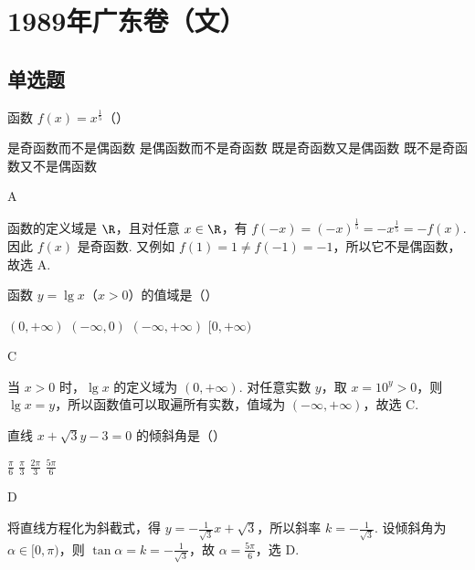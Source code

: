 \chapter{1989年广东卷（文）}

\section{单选题}

\begin{problem}
函数 \(f(x)=x^{\frac{1}{5}}\)（\quad）

\choices
    {是奇函数而不是偶函数}
    {是偶函数而不是奇函数}
    {既是奇函数又是偶函数}
    {既不是奇函数又不是偶函数}
\end{problem}

\begin{answer}
A
\end{answer}

\begin{solution}
函数的定义域是 \(\R\)，且对任意 \(x\in\R\)，有 \(f(-x)=(-x)^{\frac15}=-x^{\frac15}=-f(x)\). 因此 \(f(x)\) 是奇函数. 又例如 \(f(1)=1\neq f(-1)=-1\)，所以它不是偶函数，故选 A.
\end{solution}

\begin{problem}
函数 \(y=\lg x\)（\(x>0\)）的值域是（\quad）

\choices
    {\((0,+\infty)\)}
    {\((-\infty,0)\)}
    {\((-\infty,+\infty)\)}
    {\([0,+\infty)\)}
\end{problem}

\begin{answer}
C
\end{answer}

\begin{solution}
当 \(x>0\) 时，\(\lg x\) 的定义域为 \((0,+\infty)\). 对任意实数 \(y\)，取 \(x=10^y>0\)，则 \(\lg x=y\)，所以函数值可以取遍所有实数，值域为 \((-\infty,+\infty)\)，故选 C.
\end{solution}

\begin{problem}
直线 \(x+\sqrt{3}y-3=0\) 的倾斜角是（\quad）

\choices
    {\(\frac{\pi}{6}\)}
    {\(\frac{\pi}{3}\)}
    {\(\frac{2\pi}{3}\)}
    {\(\frac{5\pi}{6}\)}
\end{problem}

\begin{answer}
D
\end{answer}

\begin{solution}
将直线方程化为斜截式，得 \(y=-\frac{1}{\sqrt{3}}x+\sqrt{3}\)，所以斜率 \(k=-\frac{1}{\sqrt{3}}\). 设倾斜角为 \(\alpha\in[0,\pi)\)，则 \(\tan\alpha=k=-\frac{1}{\sqrt{3}}\)，故 \(\alpha=\frac{5\pi}{6}\)，选 D.
\end{solution}

